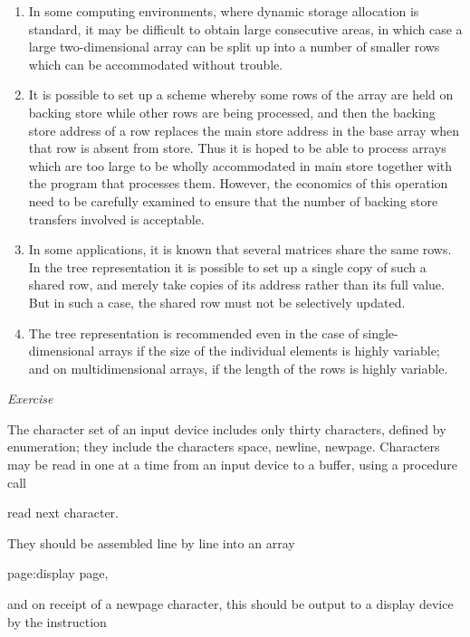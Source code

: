 \documentclass[twoside,11pt]{book}
\begin{document}
\begin{enumerate}[wide, nosep, label=(\arabic*)]
	\item In some computing environments, where dynamic storage allocation is standard, it may be difficult to obtain large consecutive areas, in which case a large two-dimensional array can be split up into a number of smaller rows which can be accommodated without trouble.

	\item It is possible to set up a scheme whereby some rows of the array are held on backing store while other rows are being processed, and then the backing store address of a row replaces the main store address in the base array when that row is absent from store. Thus it is hoped to be able to process arrays which are too large to be wholly accommodated in main store together with the program that processes them. However, the economics of this operation need to be carefully examined to ensure that the number of backing store transfers involved is acceptable.

	\item In some applications, it is known that several matrices share the same rows. In the tree representation it is possible to set up a single copy of such a shared row, and merely take copies of its address rather than its full value. But in such a case, the shared row must not be selectively updated.

	\item The tree representation is recommended even in the case of single-dimensional arrays if the size of the individual elements is highly variable; and on multidimensional arrays, if the length of the rows is highly variable.
\end{enumerate}

\noindent
\textit{Exercise}
\nopagebreak

\noindent
The character set of an input device includes only thirty characters, defined by enumeration; they include the characters space, newline, newpage. Characters may be read in one at a time from an input device to a buffer, using a procedure call

\quad read next character.

\noindent
They should be assembled line by line into an array

\quad page:display page,

\noindent
and on receipt of a newpage character, this should be output to a display device by the instruction
\end{document}
